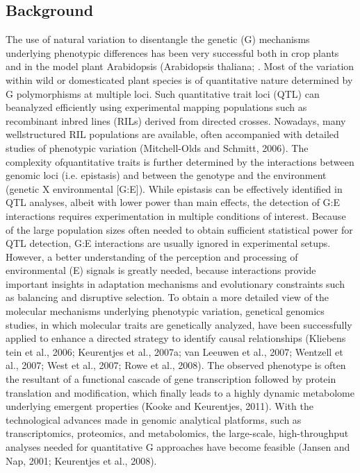 \subsection{Background}
The use of natural variation to disentangle the genetic (G) mechanisms underlying phenotypic differences 
has been very successful both in crop plants and in the model plant Arabidopsis (Arabidopsis thaliana; 
\cite{Alonso-Blanco:2009}. Most of the variation within wild or domesticated plant species is of 
quantitative nature determined by G polymorphisms at multiple loci. Such quantitative trait loci (QTL) 
can beanalyzed efficiently using experimental mapping populations such as recombinant inbred lines (RILs)
derived from directed crosses. Nowadays, many wellstructured RIL populations are available, often 
accompanied with detailed studies of phenotypic variation (Mitchell-Olds and Schmitt, 2006). The complexity 
ofquantitative traits is further determined by the interactions between genomic loci (i.e. epistasis) and 
between the genotype and the environment (genetic X environmental [G:E]). While epistasis can be effectively
identified in QTL analyses, albeit with lower power than main effects, the detection of G:E interactions 
requires experimentation in multiple conditions of interest. Because of the large population sizes often 
needed to obtain sufficient statistical power for QTL detection, G:E interactions are usually ignored in 
experimental setups. However, a better understanding of the perception and processing of environmental (E)
signals is greatly needed, because interactions provide important insights in adaptation mechanisms and
evolutionary constraints such as balancing and disruptive selection. To obtain a more detailed view of the
molecular mechanisms underlying phenotypic variation, genetical genomics studies, in which molecular traits
are genetically analyzed, have been successfully applied to enhance a directed strategy to identify causal
relationships (Kliebens tein et al., 2006; Keurentjes et al., 2007a; van Leeuwen et al., 2007; 
Wentzell et al., 2007; West et al., 2007; Rowe et al., 2008). The observed phenotype is often the resultant 
of a functional cascade of gene transcription followed by protein translation and modification, which 
finally leads to a highly dynamic metabolome underlying emergent properties (Kooke and Keurentjes, 2011). 
With the technological advances made in genomic analytical platforms, such as transcriptomics, proteomics, 
and metabolomics, the large-scale, high-throughput analyses needed for quantitative G approaches have 
become feasible (Jansen and Nap, 2001; Keurentjes et al., 2008). 

